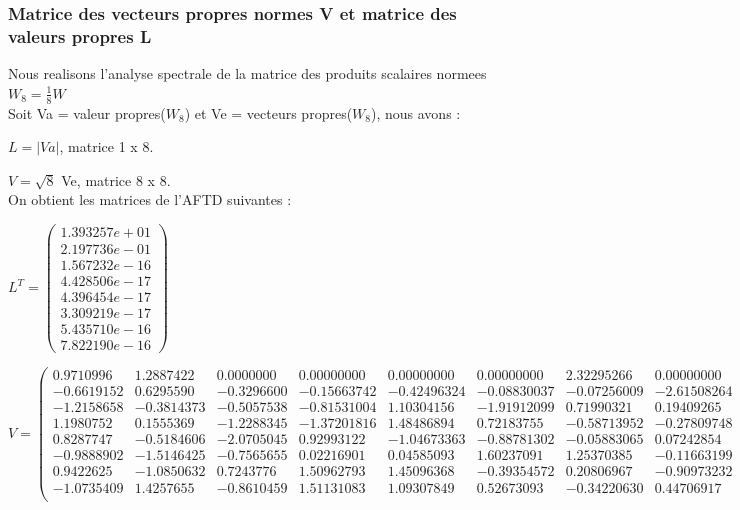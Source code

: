 \documentclass[a4paper,11pt]{article}
\begin{document}
\subsubsection{Matrice des vecteurs propres normes V et matrice des valeurs propres L}

\noindent Nous realisons l'analyse spectrale de la matrice des produits scalaires normees $W_8 = \frac{1}{8} W$\\
\noindent Soit Va = valeur propres($W_8$) et Ve = vecteurs propres($W_8$), nous avons :

$L = \left| Va \right| $, matrice 1 x 8.

$V = \sqrt{8}$ Ve, matrice 8 x 8.\\

\noindent On obtient les matrices de l'AFTD suivantes : 
\begin{center}
$L^T = \begin{pmatrix}
1.393257e+01\\
2.197736e-01\\
1.567232e-16\\
4.428506e-17\\
4.396454e-17\\
3.309219e-17\\
5.435710e-16\\
7.822190e-16
\end{pmatrix}$
\end{center}

\hspace{-2.8cm} $V = \begin{pmatrix}
0.9710996&1.2887422&0.0000000&0.00000000&0.00000000&0.00000000&2.32295266&0.00000000\\
-0.6619152&0.6295590&-0.3296600&-0.15663742&-0.42496324&-0.08830037&-0.07256009&-2.61508264\\
-1.2158658&-0.3814373&-0.5057538&-0.81531004&1.10304156&-1.91912099&0.71990321&0.19409265\\
1.1980752&0.1555369&-1.2288345&-1.37201816&1.48486894&0.72183755&-0.58713952&-0.27809748\\
0.8287747&-0.5184606&-2.0705045&0.92993122&-1.04673363&-0.88781302&-0.05883065&0.07242854\\
-0.9888902&-1.5146425&-0.7565655&0.02216901&0.04585093&1.60237091&1.25370385&-0.11663199\\
0.9422625&-1.0850632&0.7243776&1.50962793&1.45096368&-0.39354572&0.20806967&-0.90973232\\
-1.0735409&1.4257655&-0.8610459&1.51131083&1.09307849&0.52673093&-0.34220630&0.44706917\\
\end{pmatrix}$\\
\\
\end{document}
